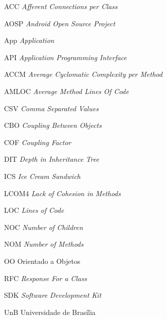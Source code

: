 \begin{siglas}

  \item[ACC] \textit{Afferent Connections per Class}
  \item[AOSP] \textit{Android Open Source Project}
  \item[App] \textit{Application}
  \item[API] \textit{Application Programming Interface}
  \item[ACCM] \textit{Average Cyclomatic Complexity per Method}
  \item[AMLOC]\textit{Average Method Lines Of Code}
  \item[CSV] \textit{Comma Separated Values}
  \item[CBO] \textit{Coupling Between Objects}
  \item[COF] \textit{Coupling Factor}
  \item[DIT] \textit{Depth in Inheritance Tree}
  \item[ICS] \textit{Ice Cream Sandwich}
  \item[LCOM4] \textit{Lack of Cohesion in Methods}
  \item[LOC] \textit{Lines of Code}
  \item[NOC] \textit{Number of Children}
  \item[NOM] \textit{Number of Methods}
  \item[OO] Orientado a Objetos
  \item[RFC] \textit{Response For a Class}
  \item[SDK] \textit{Software Development Kit}
  \item[UnB] Universidade de Brasília

\end{siglas}

